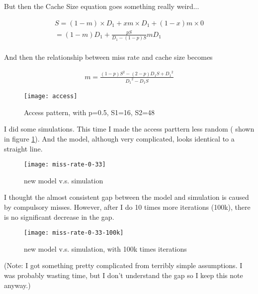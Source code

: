 \documentclass[12pt, letterpaper]{article}
\begin{document}
But then the Cache Size equation goes something really weird...

\begin{equation}
\begin{split}
S = (1-m) \times D_{1} + xm \times D_{1} + (1-x)m \times 0 \\
= (1-m)D_{1} + \frac{pS}{D_{1}-(1-p)S} m D_{1} \\
\end{split}
\end{equation}

And then the relationship between miss rate and cache size becomes

\begin{equation}
\begin{split}
m = \frac{(1-p)S^2-(2-p)D_{1}S+{D_{1}}^2}{{D_{1}}^2-D_{1}S}
\end{split}
\end{equation}

\begin{figure}[h]
\texttt{[image: access]}
\caption{Access pattern, with p=0.5, S1=16, S2=48}
\label{fig:access}
\end{figure}

I did some simulations. This time I made the access parttern less random (
shown in figure \ref{fig:access}). And the model, although very complicated,
looks identical to a straight line.

\begin{figure}[h]
\texttt{[image: miss-rate-0-33]}
\caption{new model v.s. simulation}
\end{figure}

I thought the almost consistent gap between the model and simulation is caused
by compulsory misses. However, after I do 10 times more iterations (100k),
there is no significant decrease in the gap.

\begin{figure}[h]
\texttt{[image: miss-rate-0-33-100k]}
\caption{new model v.s. simulation, with 100k times iterations}
\end{figure}

(Note: I got something pretty complicated from terribly simple assumptions. I
was probably wasting time, but I don't understand the gap so I keep this note
anyway.)
\end{document}
